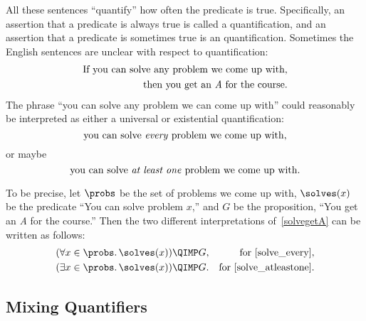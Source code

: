 All these sentences ``quantify'' how often the predicate is true.
Specifically, an assertion that a predicate is always true is called a
 quantification, and an assertion that a predicate is
sometimes true is an  quantification.  Sometimes the
English sentences are unclear with respect to quantification:
\begin{align}
  \text{If you can solve any problem we come up with,}\notag\\
  \text{then you get an \emph{A} for the course.}\label{solvegetA}
\end{align}
%
The phrase ``you can solve any problem we can come up with'' could
reasonably be interpreted as either a universal or existential
quantification:
\begin{equation}\label{solve_every}
\text{you can solve \emph{every} problem we come up with,}
\end{equation}
or maybe
\begin{equation}\label{solve_atleastone}
\text{you can solve \emph{at least one} problem we come up with.}
\end{equation}

\iffalse
In any case, notice that this quantified phrase appears inside a
larger if-then statement.  This is quite normal; quantified statements
are themselves propositions and can be combined
with \QAND, \QOR, \QIMPLIES, etc., just like any other proposition.
\fi
To be precise, let $\probs$ be the set of problems we come up with,
$\solves(x)$ be the predicate ``You can solve problem $x$,'' and $G$
be the proposition, ``You get an \emph{A} for the course.''  Then the
two different interpretations of~\eqref{solvegetA}
can be written as follows:
\begin{align*}
(\forall x \in \probs.\, & \solves(x)) \QIMP G,
     & \text{for~\eqref{solve_every}},\\
(\exists x \in \probs.\, & \solves(x)) \QIMP G.
     & \text{for~\eqref{solve_atleastone}}.
\end{align*}

\subsection{Mixing Quantifiers}

